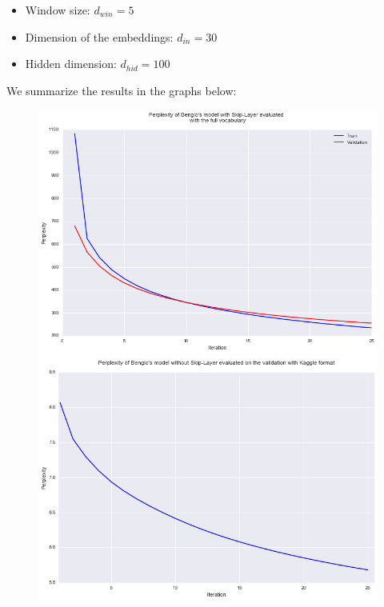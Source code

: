 \documentclass[11pt]{article}
\begin{document}
\begin{itemize}
\item Window size: $d_{win} = 5$
\item Dimension of the embeddings: $d_{in} = 30$
\item Hidden dimension: $d_{hid} = 100$
\end{itemize}

We summarize the results in the graphs below:

\begin{figure}[H]
  \centering
  \begin{minipage}[b]{0.45\textwidth}
    \includegraphics[width=\textwidth]{noskip_tr}
  \end{minipage}
  \hfill
  \begin{minipage}[b]{0.45\textwidth}
    \includegraphics[width=\textwidth]{noskip_val}
  \end{minipage}
\end{figure}
\end{document}
